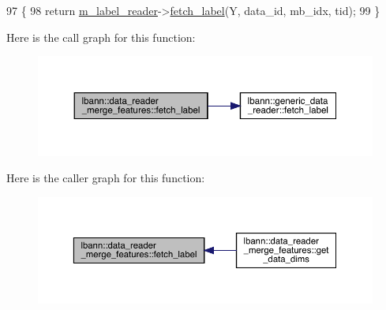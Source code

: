 \begin{DoxyCode}
97                                                       \{
98   \textcolor{keywordflow}{return} \hyperlink{classlbann_1_1data__reader__merge__features_a1e54a136c63b934f44ff91dc68ea3b27}{m\_label\_reader}->\hyperlink{classlbann_1_1generic__data__reader_a03627408c1d1aa28691d31232fe1dce5}{fetch\_label}(Y, data\_id, mb\_idx, tid);
99 \}
\end{DoxyCode}
Here is the call graph for this function\+:\nopagebreak
\begin{figure}[H]
\begin{center}
\leavevmode
\includegraphics[width=350pt]{classlbann_1_1data__reader__merge__features_aace9abfab36e0926832ed6773b41e0ea_cgraph}
\end{center}
\end{figure}
Here is the caller graph for this function\+:\nopagebreak
\begin{figure}[H]
\begin{center}
\leavevmode
\includegraphics[width=350pt]{classlbann_1_1data__reader__merge__features_aace9abfab36e0926832ed6773b41e0ea_icgraph}
\end{center}
\end{figure}
\mbox{\label{classlbann_1_1data__reader__merge__features_afd9fa7d10c466eca62ac7af3cbc3ddcb}} 

